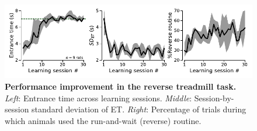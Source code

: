 \begin{figure}[h!]
	\begin{center}
		\includegraphics[scale=1]{ch-appendicies/figures/RevTrdLearning.pdf}
		\caption
		{\textbf{Performance improvement in the reverse treadmill task.}
		\textit{Left}: Entrance time across learning sessions.
		\textit{Middle}: Session-by-session standard deviation of ET.
		\textit{Right}: Percentage of trials during which animals used the run-and-wait (reverse) routine.
		}
		\label{fig:appendix:revLearn}
	\end{center}
\end{figure}